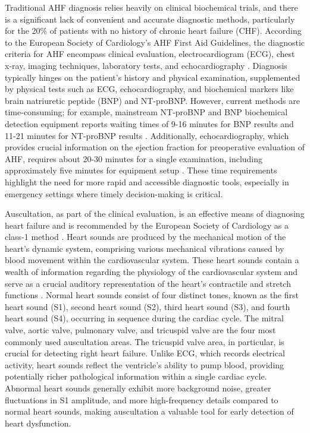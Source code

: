 Traditional AHF diagnosis relies heavily on clinical biochemical trials, and there is a significant lack of convenient and accurate diagnostic methods, particularly for the 20\% of patients with no history of chronic heart failure (CHF). According to the European Society of Cardiology's AHF First Aid Guidelines, the diagnostic criteria for AHF encompass clinical evaluation, electrocardiogram (ECG), chest x-ray, imaging techniques, laboratory tests, and echocardiography \cite{nieminen2005task}. Diagnosis typically hinges on the patient's history and physical examination, supplemented by physical tests such as ECG, echocardiography, and biochemical markers like brain natriuretic peptide (BNP) and NT-proBNP. However, current methods are time-consuming; for example, mainstream NT-proBNP and BNP biochemical detection equipment reports waiting times of 9-16 minutes for BNP results and 11-21 minutes for NT-proBNP results \cite{lewis2020bnp}. Additionally, echocardiography, which provides crucial information on the ejection fraction for preoperative evaluation of AHF, requires about 20-30 minutes for a single examination, including approximately five minutes for equipment setup \cite{menon2022echocardiography}. These time requirements highlight the need for more rapid and accessible diagnostic tools, especially in emergency settings where timely decision-making is critical.

Auscultation, as part of the clinical evaluation, is an effective means of diagnosing heart failure and is recommended by the European Society of Cardiology as a class-1 method \cite{nieminen2005task}. Heart sounds are produced by the mechanical motion of the heart's dynamic system, comprising various mechanical vibrations caused by blood movement within the cardiovascular system. These heart sounds contain a wealth of information regarding the physiology of the cardiovascular system and serve as a crucial auditory representation of the heart's contractile and stretch functions \cite{johnston2007third,wynne2001clinical,boorsma2020congestion}. Normal heart sounds consist of four distinct tones, known as the first heart sound (S1), second heart sound (S2), third heart sound (S3), and fourth heart sound (S4), occurring in sequence during the cardiac cycle. The mitral valve, aortic valve, pulmonary valve, and tricuspid valve are the four most commonly used auscultation areas. The tricuspid valve area, in particular, is crucial for detecting right heart failure. Unlike ECG, which records electrical activity, heart sounds reflect the ventricle's ability to pump blood, providing potentially richer pathological information within a single cardiac cycle. Abnormal heart sounds generally exhibit more background noise, greater fluctuations in S1 amplitude, and more high-frequency details compared to normal heart sounds, making auscultation a valuable tool for early detection of heart dysfunction.
